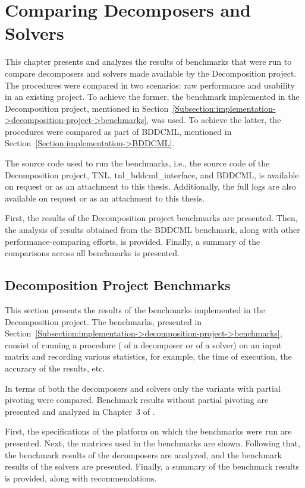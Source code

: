 \chapter{Comparing Decomposers and Solvers}\label{Chapter:comparing-decomposers-and-solvers}

This chapter presents and analyzes the results of benchmarks that were run to compare decomposers and solvers made available by the Decomposition project. The procedures were compared in two scenarios: raw performance and usability in an existing project. To achieve the former, the benchmark implemented in the Decomposition project, mentioned in Section~\ref{Subsection:implementation->decomposition-project->benchmarks}, was used. To achieve the latter, the procedures were compared as part of BDDCML, mentioned in Section~\ref{Section:implementation->BDDCML}.

The source code used to run the benchmarks, i.e., the source code of the Decomposition project, TNL, tnl\_bddcml\_interface, and BDDCML, is available on request or as an attachment to this thesis. Additionally, the full logs are also available on request or as an attachment to this thesis.

First, the results of the Decomposition project benchmarks are presented. Then, the analysis of results obtained from the BDDCML benchmark, along with other performance-comparing efforts, is provided. Finally, a summary of the comparisons across all benchmarks is presented.

\section{Decomposition Project Benchmarks}\label{Section:comparing-decomposers-and-solvers->decomposition-project-benchmarks}
This section presents the results of the benchmarks implemented in the Decomposition project. The benchmarks, presented in Section~\ref{Subsection:implementation->decomposition-project->benchmarks}, consist of running a procedure ( of a decomposer or  of a solver) on an input matrix and recording various statistics, for example, the time of execution, the accuracy of the results, etc.

In terms of both the decomposers and solvers only the variants with partial pivoting were compared. Benchmark results without partial pivoting are presented and analyzed in Chapter~3 of  \cite{Cejka2022}.

First, the specifications of the platform on which the benchmarks were run are presented. Next, the matrices used in the benchmarks are shown. Following that, the benchmark results of the decomposers are analyzed, and the benchmark results of the solvers are presented. Finally, a summary of the benchmark results is provided, along with recommendations.


